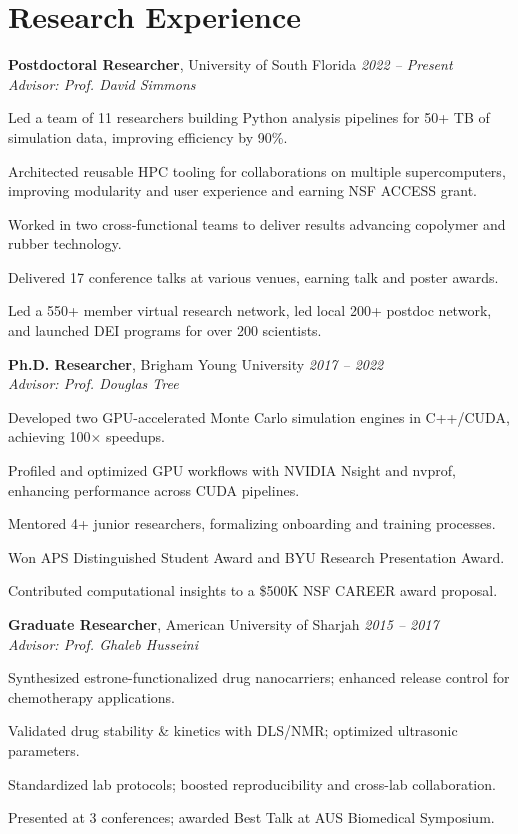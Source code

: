 \section*{Research Experience}
\textbf{Postdoctoral Researcher}, University of South Florida \hfill \textit{2022 – Present} \\
\textit{Advisor: Prof. David Simmons}
\begin{tabitemize}[leftmargin=*]
    \item Led a team of 11 researchers building Python analysis pipelines for 50+ TB of simulation data, improving efficiency by 90\%.
    \item Architected reusable HPC tooling for collaborations on multiple supercomputers, improving modularity and user experience and earning NSF ACCESS grant.
    \item Worked in two cross-functional teams to deliver results advancing copolymer and rubber technology.
    \item Delivered 17 conference talks at various venues, earning talk and poster awards.
    \item Led a 550+ member virtual research network, led local 200+ postdoc network, and launched DEI programs for over 200 scientists.
\end{tabitemize} \hfill
\textbf{Ph.D. Researcher}, Brigham Young University \hfill \textit{2017 – 2022} \\
\textit{Advisor: Prof. Douglas Tree}
\begin{tabitemize}[leftmargin=*]
    \item Developed two GPU-accelerated Monte Carlo simulation engines in C++/CUDA, achieving 100$\times$ speedups.
    \item Profiled and optimized GPU workflows with NVIDIA Nsight and nvprof, enhancing performance across CUDA pipelines.
    \item Mentored 4+ junior researchers, formalizing onboarding and training processes.
    \item Won APS Distinguished Student Award and BYU Research Presentation Award.
    \item Contributed computational insights to a \$500K NSF CAREER award proposal.
\end{tabitemize} \hfill
\textbf{Graduate Researcher}, American University of Sharjah \hfill \textit{2015 – 2017} \\
\textit{Advisor: Prof. Ghaleb Husseini}
\begin{tabitemize}[leftmargin=*]
  \item Synthesized estrone-functionalized drug nanocarriers; enhanced release control for chemotherapy applications.
  \item Validated drug stability \& kinetics with DLS/NMR; optimized ultrasonic parameters.
  \item Standardized lab protocols; boosted reproducibility and cross-lab collaboration.
  \item Presented at 3 conferences; awarded Best Talk at AUS Biomedical Symposium.
\end{tabitemize}
